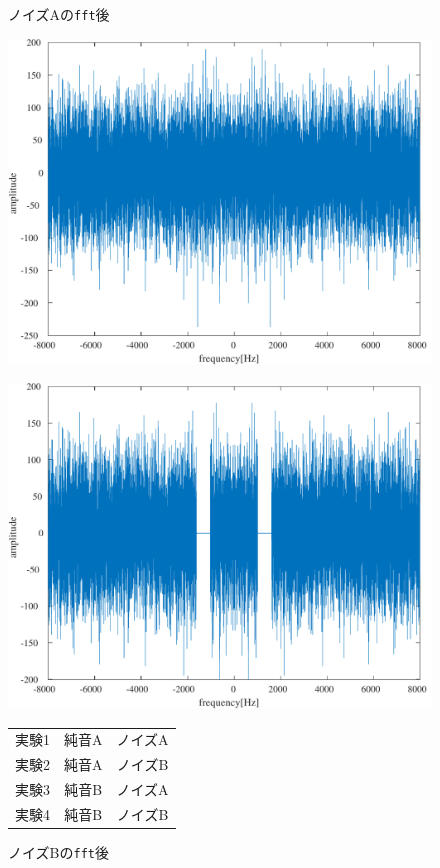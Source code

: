 \begin{figure}[H]
    \centering
    \begin{minipage}{.49\textwidth}
        \centering
        \caption{ノイズAの\texttt{fft}後}
        \label{fig:ノイズAのFFT後}
        \includegraphics[keepaspectratio,width=.3\textwidth]{../../Figures/04_20_Afft.pdf}
        \caption{ノイズBの\texttt{fft}後}
        \label{fig:ノイズBのFFT後}
        \includegraphics[keepaspectratio,width=.3\textwidth]{../../Figures/04_21_Bfft.pdf}
    \end{minipage}
    \begin{minipage}{.49\textwidth}
        \centering
        \begin{tabularx}{\textwidth}{CCC}
            実験1 & 純音A & ノイズA \\
            実験2 & 純音A & ノイズB \\
            実験3 & 純音B & ノイズA \\
            実験4 & 純音B & ノイズB
        \end{tabularx}
    \end{minipage}
\end{figure}